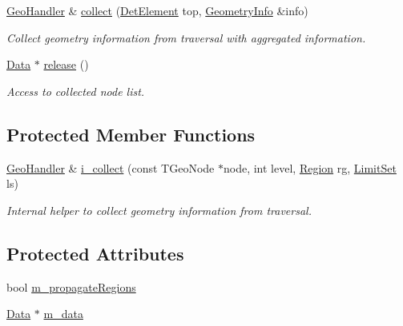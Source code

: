 \begin{DoxyCompactItemize}
\hyperlink{class_d_d4hep_1_1_geometry_1_1_geo_handler}{GeoHandler} \& \hyperlink{class_d_d4hep_1_1_geometry_1_1_geo_handler_a807765ba56e60835ab300a906d008f07}{collect} (\hyperlink{class_d_d4hep_1_1_geometry_1_1_det_element}{DetElement} top, \hyperlink{class_d_d4hep_1_1_geometry_1_1_geo_handler_types_1_1_geometry_info}{GeometryInfo} \&info)
\begin{DoxyCompactList}\small\item\em Collect geometry information from traversal with aggregated information. \item\end{DoxyCompactList}\item 
\hyperlink{class_d_d4hep_1_1_geometry_1_1_geo_handler_types_a568935b7e878d3ea9fe97a2ecf33d641}{Data} $\ast$ \hyperlink{class_d_d4hep_1_1_geometry_1_1_geo_handler_afaa693916e577c74e90854f66123cc05}{release} ()
\begin{DoxyCompactList}\small\item\em Access to collected node list. \item\end{DoxyCompactList}\end{DoxyCompactItemize}
\subsection*{Protected Member Functions}
\begin{DoxyCompactItemize}
\item 
\hyperlink{class_d_d4hep_1_1_geometry_1_1_geo_handler}{GeoHandler} \& \hyperlink{class_d_d4hep_1_1_geometry_1_1_geo_handler_ab075dd24d4b494b1f6b8508e39d6426b}{i\_\-collect} (const TGeoNode $\ast$node, int level, \hyperlink{class_d_d4hep_1_1_geometry_1_1_region}{Region} rg, \hyperlink{class_d_d4hep_1_1_geometry_1_1_limit_set}{LimitSet} ls)
\begin{DoxyCompactList}\small\item\em Internal helper to collect geometry information from traversal. \item\end{DoxyCompactList}\end{DoxyCompactItemize}
\subsection*{Protected Attributes}
\begin{DoxyCompactItemize}
\item 
bool \hyperlink{class_d_d4hep_1_1_geometry_1_1_geo_handler_a8fa03e76401899e921dffb88684e89be}{m\_\-propagateRegions}
\item 
\hyperlink{class_d_d4hep_1_1_geometry_1_1_geo_handler_types_a568935b7e878d3ea9fe97a2ecf33d641}{Data} $\ast$ \hyperlink{class_d_d4hep_1_1_geometry_1_1_geo_handler_a2ac33960ec9497e7a5f064c3ae0a0747}{m\_\-data}
\end{DoxyCompactItemize}
